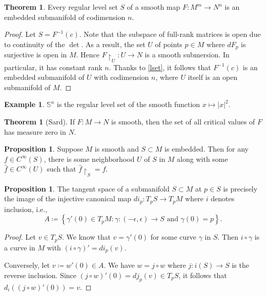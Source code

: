 \documentclass[10pt,letterpaper,cm]{nupset}
\theoremstyle{definition}
\newtheorem{exmp}[definition]{Example}
\theoremstyle{theorem}
\newtheorem{theorem}[definition]{Theorem}
\newtheorem{prop}[definition]{Proposition}
\theoremstyle{remark}
\renewcommand{\S}{\mathbb S}
\newcommand{\1}{\mathbf{1}}
\newcommand{\0}{\vec 0}
\begin{document}
\begin{theorem}\label{rls}
Every regular level set $S$ of a smooth map $F: M^m \to N^n$ is an embedded submanifold of codimension $n$.
\end{theorem}
\begin{proof}
Let $S= F^{-1}(c)$. Note that  the subspace of full-rank matrices is open due to continuity of the $\det$. As a result, the set $U$ of points $p\in M$ where $dF_p$ is surjective is open in $M$. Hence $F\restriction_U : U \to N$ is a smooth submersion. In particular, it has constant rank $n$. Thanks to \cref{lset}, it follows that $F^{-1}(c)$ is an embedded submanifold of $U$ with codimension $n$, where $U$ itself is an open submanifold of $M$.
\end{proof}

\begin{exmp}
$\S^n$ is the regular level set of the smooth function $x\mapsto \lvert{x}\rvert^2$.
\end{exmp}

\begin{theorem}[Sard]\label{sard}
If $F: M \to N$ is smooth, then the set of all critical values of $F$ has measure zero in $N$.
\end{theorem}

\begin{prop}
Suppose $M$ is smooth and $S\subset M$ is embedded. Then for any $f \in C^{\infty}(S)$, there is some neighborhood $U$ of $S$ in $M$ along with some $\hat{f} \in C^{\infty}(U)$ such that $\hat{f}\restriction_S = f$.
\end{prop}
\begin{prop}
The tangent space of a submanifold $S \subset M$ at $p\in S$ is precisely the image of the injective canonical map $di_p : T_pS \to T_p M$ where $i$ denotes inclusion, i.e., $$A\coloneqq \left\{ \gamma ' (0) \in T_pM : \gamma : ({-\epsilon}, \epsilon) \to S \text{ and } \gamma(0) =p\right\}.$$
\end{prop}
\begin{proof}
Let $v \in T_pS$. We know that $v= \gamma'(0)$ for some curve $\gamma$ in $S$. Then $i \circ \gamma$ is a curve in $M$ with $\left(i \circ \gamma\right)'= di_p(v)$. 

Conversely, let $v\coloneqq  w'(0) \in A$. We have $w = j \circ w$ where $j: i(S) \to S$ is the reverse inclusion. Since $(j \circ w)'(0) = dj_p(v) \in T_pS$, it follows that $d_i((j \circ w)'(0)) = v$.
\end{proof}

\bigskip
\end{document}
